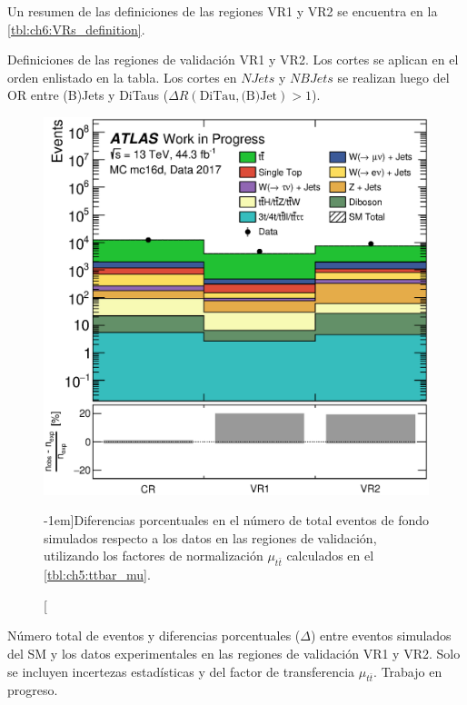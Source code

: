 Un resumen de las definiciones de las regiones VR1 y VR2 se encuentra en la \cref{tbl:ch6:VRs_definition}.

\begin{table}[b]
    \small%
    \setlength{\tabcolsep}{1.2mm}%
    
    \caption{Definiciones de las regiones de validación VR1 y VR2. Los cortes se aplican en el orden enlistado en la tabla. Los cortes en $NJets$ y $NBJets$ se realizan luego del OR entre (B)Jets y DiTaus ($\Delta R(\text{DiTau}, \text{(B)Jet}) > 1$).}
    \label{tbl:ch6:VRs_definition}
\end{table}



\begin{figure}[t]
    \hspace{2em}
    \includegraphics[width=0.75\linewidth]{Assets/Plots/h_mc16d_data17_delta.eps}
    \caption[][-1em]{Diferencias porcentuales en el número de total eventos de fondo simulados respecto a los datos en las regiones de validación, utilizando los factores de normalización $\mu_{t\bar{t}}$ calculados en el \cref{tbl:ch5:ttbar_mu}.}
    \label{fig:ch6:VRs_results}
\end{figure}

\begin{table}[t]
    \small%
    \centering%
    
    \caption{Número total de eventos y diferencias porcentuales ($\Delta$) entre eventos simulados del SM y los datos experimentales en las regiones de validación VR1 y VR2. Solo se incluyen incertezas estadísticas y del factor de transferencia $\mu_{t\bar{t}}$. Trabajo en progreso.}
    \label{tbl:ch6:VRs_results}
\end{table}

